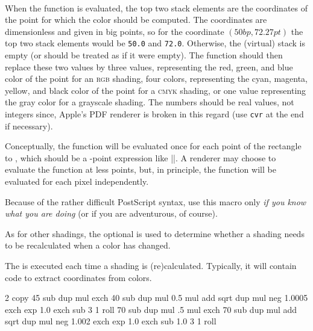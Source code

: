 \begin{command}{\pgfdeclarefunctionalshading{}\\
}
    When the function is evaluated, the top two stack elements are the
    coordinates of the point for which the color should be computed. The
    coordinates are dimensionless and given in big points, so for the
    coordinate $(50bp, 72.27pt)$ the top two stack elements would be
    \texttt{50.0} and \texttt{72.0}. Otherwise, the (virtual) stack is empty
    (or should be treated as if it were empty). The function should then
    replace these two values by three values, representing the red, green, and
    blue color of the point for an \textsc{rgb} shading, four colors,
    representing the cyan, magenta, yellow, and black color of the point for a
    \textsc{cmyk} shading, or one value representing the gray color for a
    grayscale shading. The numbers should be real values, not integers
    since, Apple's PDF renderer is broken in this regard (use \texttt{cvr} at
    the end if necessary).

    Conceptually, the function will be evaluated once for each point of the
    rectangle  to , which
    should be a \pgfname-point expression like |\pgfpoint{100bp}{100bp}|. A
    renderer may choose to evaluate the function at less points, but, in
    principle, the function will be evaluated for each pixel independently.

    Because of the rather difficult PostScript syntax, use this macro only
    \emph{if you know what you are doing} (or if you are adventurous, of
    course).

    As for other shadings, the optional  is used to determine
    whether a shading needs to be recalculated when a color has changed.

    The  is executed each time a shading is (re)calculated.
    Typically, it will contain code to extract coordinates from colors.
\begin{codeexample}[]
    {\pgfpointorigin}{\pgfpoint{4cm}{4cm}}{}{
  2 copy
  45 sub dup mul exch
  40 sub dup mul 0.5 mul add sqrt
  dup mul neg 1.0005 exch exp 1.0 exch sub
  3 1 roll
  70 sub dup mul .5 mul exch
  70 sub dup mul add sqrt
  dup mul neg 1.002 exch exp 1.0 exch sub
  1.0 3 1 roll
}
\end{codeexample}


\end{command}

